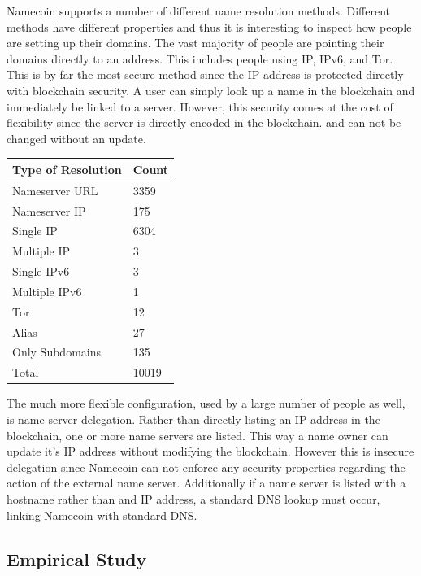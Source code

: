 Namecoin supports a number of different name resolution methods. Different methods have different properties and thus it is interesting to inspect how people are setting up their domains. The vast majority of people are pointing their domains directly to an address. This includes people using IP, IPv6, and Tor. This is by far the most secure method since the IP address is protected directly with blockchain security. A user can simply look up a name in the blockchain and immediately be linked to a server. However, this security comes at the cost of flexibility since the server is directly encoded in the blockchain. and can not be changed without an update.

\begin{table}[t]
\begin{tabular}{ll}
Type of Resolution & Count \\ \hline
Nameserver URL     & 3359  \\
Nameserver IP      & 175   \\
Single IP          & 6304  \\
Multiple IP        & 3     \\
Single IPv6        & 3     \\
Multiple IPv6      & 1     \\
Tor                & 12    \\
Alias              & 27    \\
Only Subdomains    & 135   \\ \hline
Total              & 10019
\end{tabular}
\end{table}


The much more flexible configuration, used by a large number of people as well, is name server delegation. Rather than directly listing an IP address in the blockchain, one or more name servers are listed. This way a name owner can update it's IP address without modifying the blockchain. However this is insecure delegation since Namecoin can not enforce any security properties regarding the action of the external name server. Additionally if a name server is listed with a hostname rather than and IP address, a standard DNS lookup must occur, linking Namecoin with standard DNS.

\subsection{Empirical Study}
\label{domainbreakdown}

